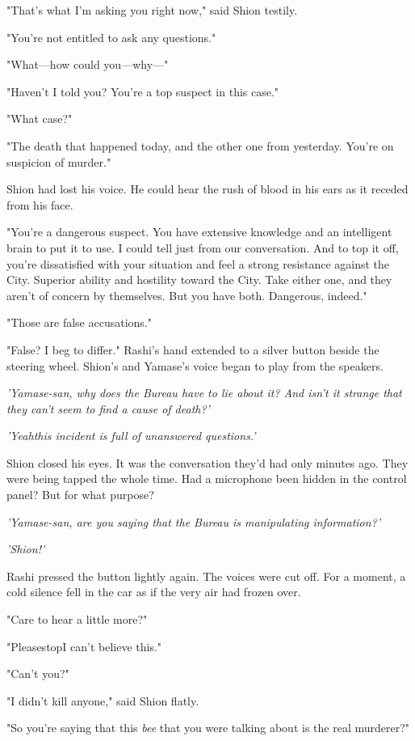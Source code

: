 "That's what I'm asking you right now," said Shion testily.

"You're not entitled to ask any questions."

"What---how could you---why---"

"Haven't I told you? You're a top suspect in this case."

"What case?"

"The death that happened today, and the other one from yesterday. You're
on suspicion of murder."

Shion had lost his voice. He could hear the rush of blood in his ears as
it receded from his face.

"You're a dangerous suspect. You have extensive knowledge and an
intelligent brain to put it to use. I could tell just from our
conversation. And to top it off, you're dissatisfied with your situation
and feel a strong resistance against the City. Superior ability and
hostility toward the City. Take either one, and they aren't of concern
by themselves. But you have both. Dangerous, indeed."

"Those are false accusations."

"False? I beg to differ." Rashi's hand extended to a silver button
beside the steering wheel. Shion's and Yamase's voice began to play from
the speakers.

\emph{'Yamase-san, why does the Bureau have to lie about it? And isn't it
strange that they can't seem to find a cause of death?'}

\emph{'Yeah\el this incident is full of unanswered questions.'}

Shion closed his eyes. It was the conversation they'd had only minutes
ago. They were being tapped the whole time. Had a microphone been hidden
in the control panel? But for what purpose?

\emph{'Yamase-san, are you saying that the Bureau is manipulating
information?'}

\emph{'Shion!'}

Rashi pressed the button lightly again. The voices were cut off. For a
moment, a cold silence fell in the car as if the very air had frozen
over.

"Care to hear a little more?"

"Please\el stop\el I can't believe this."

"Can't you?"

"I didn't kill anyone," said Shion flatly.

"So you're saying that this \emph{bee} that you were talking about is the real
murderer?"

